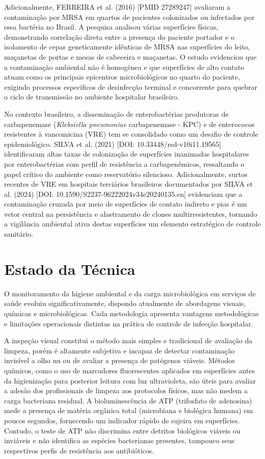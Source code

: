 \documentclass[12pt,a4paper]{article}
\begin{document}
Adicionalmente, FERREIRA et al. (2016) [PMID 27289247] avaliaram a contaminação por MRSA em quartos de pacientes colonizados ou infectados por essa bactéria no Brasil. A pesquisa analisou várias superfícies físicas, demonstrando correlação direta entre a presença do paciente portador e o isolamento de cepas geneticamente idênticas de MRSA nas superfícies do leito, maçanetas de portas e mesas de cabeceira e maçanetas. O estudo evidenciou que a contaminação ambiental não é homogênea e que superfícies de alto contato atuam como os principais epicentros microbiológicos no quarto do paciente, exigindo processos específicos de desinfecção terminal e concorrente para quebrar o ciclo de transmissão no ambiente hospitalar brasileiro.

No contexto brasileiro, a disseminação de enterobactérias produtoras de carbapenemase (\textit{Klebsiella pneumoniae} carbapenemase - KPC) e de enterococos resistentes à vancomicina (VRE) tem se consolidado como um desafio de controle epidemiológico. SILVA et al. (2021) [DOI: 10.33448/rsd-v10i11.19565] identificaram altas taxas de colonização de superfícies inanimadas hospitalares por enterobactérias com perfil de resistência a carbapenêmicos, ressaltando o papel crítico do ambiente como reservatório silencioso. Adicionalmente, surtos recentes de VRE em hospitais terciários brasileiros documentados por SILVA et al. (2024) [DOI: 10.1590/S2237-96222024v34e20240135.en] evidenciam que a contaminação cruzada por meio de superfícies de contato indireto e pias é um vetor central na persistência e alastramento de clones multirresistentes, tornando a vigilância ambiental ativa destas superfícies um elemento estratégico de controle sanitário.
\newpage

\section{Estado da Técnica}
O monitoramento da higiene ambiental e da carga microbiológica em serviços de saúde evoluiu significativamente, dispondo atualmente de abordagens visuais, químicas e microbiológicas. Cada metodologia apresenta vantagens metodológicas e limitações operacionais distintas na prática de controle de infecção hospitalar.

A inspeção visual constitui o método mais simples e tradicional de avaliação da limpeza, porém é altamente subjetiva e incapaz de detectar contaminação invisível a olho nu ou de avaliar a presença de patógenos viáveis. Métodos químicos, como o uso de marcadores fluorescentes aplicados em superfícies antes da higienização para posterior leitura com luz ultravioleta, são úteis para avaliar a adesão dos profissionais de limpeza aos protocolos físicos, mas não medem a carga bacteriana residual. A bioluminescência de ATP (trifosfato de adenosina) mede a presença de matéria orgânica total (microbiana e biológica humana) em poucos segundos, fornecendo um indicador rápido de sujeira em superfícies. Contudo, o teste de ATP não discrimina entre detritos biológicos viáveis ou inviáveis e não identifica as espécies bacterianas presentes, tampouco seus respectivos perfis de resistência aos antibióticos.
\end{document}

